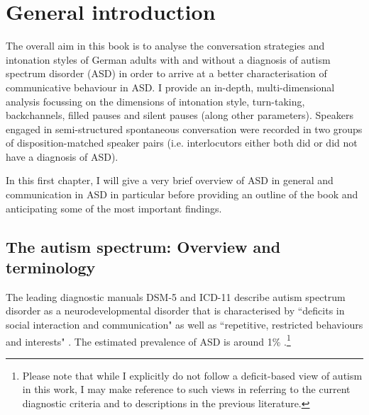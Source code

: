 \chapter{General introduction}\label{sec:introduction}

The overall aim in this book is to analyse the conversation strategies and intonation styles of German adults with and without a diagnosis of autism spectrum disorder (ASD) in order to arrive at a better characterisation of communicative behaviour in ASD. I provide an in-depth, multi-dimensional analysis focussing on the dimensions of intonation style, turn-taking, backchannels, filled pauses and silent pauses (along other parameters). Speakers engaged in semi-structured spontaneous conversation were recorded in two
groups of disposition-matched speaker pairs (i.e. interlocutors either both did or did not have a diagnosis of ASD).

In this first chapter, I will give a very brief overview of ASD in general and communication in ASD in particular before providing an outline of the book and anticipating some of the most important findings.

\section{The autism spectrum: Overview and terminology}\label{autism-spectrum}

The leading diagnostic manuals DSM-5 and ICD-11 describe autism spectrum disorder as a neurodevelopmental disorder that is characterised by ``deficits in social interaction and communication" as well as ``repetitive, restricted behaviours and interests" \citep{americanpsychiatricassociationDiagnosticStatisticalManual2013, worldhealthorganizationICD11InternationalStatistical2022}. The estimated prevalence of ASD is around 1\% \citep{christensenPrevalenceCharacteristicsAutism2018, elsabbaghGlobalPrevalenceAutism2012}.\footnote{Please note that while I explicitly do not follow a deficit-based view of autism in this work, I may make reference to such views in referring to the current diagnostic criteria and to descriptions in the previous literature.}

